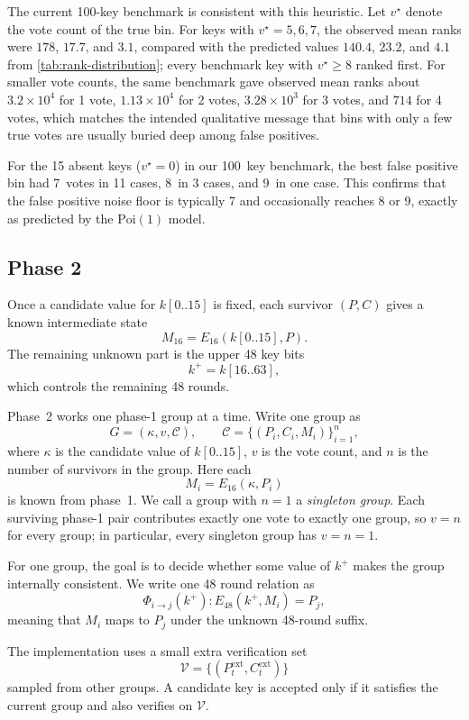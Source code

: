\documentclass[version=preprint]{iacrcc}
\begin{document}
The current 100-key benchmark is consistent with this heuristic.
Let $v^{\star}$ denote the vote count of the true bin.
For keys with $v^{\star}=5,6,7$, the observed mean ranks were $178$, $17.7$, and $3.1$, compared with the predicted values $140.4$, $23.2$, and $4.1$ from \autoref{tab:rank-distribution}; every benchmark key with $v^{\star} \geq 8$ ranked first.
For smaller vote counts, the same benchmark gave observed mean ranks about $3.2 \times 10^4$ for 1 vote, $1.13 \times 10^4$ for 2 votes, $3.28 \times 10^3$ for 3 votes, and $714$ for 4 votes, which matches the intended qualitative message that bins with only a few true votes are usually buried deep among false positives.

For the 15 absent keys ($v^{\star} = 0$) in our 100~key benchmark, the best false positive bin had 7~votes in 11 cases, 8~in 3 cases, and 9~in one case.
This confirms that the false positive noise floor is typically 7 and occasionally reaches 8 or 9, exactly as predicted by the $\mathrm{Poi}(1)$ model.

\subsection{Phase 2}

Once a candidate value for $k[0..15]$ is fixed, each survivor $(P,C)$ gives a known intermediate state
\[
M_{16} = E_{16}(k[0..15],P).
\]
The remaining unknown part is the upper 48 key bits
\[
k^{+} = k[16..63],
\]
which controls the remaining 48 rounds.

Phase~2 works one phase-1 group at a time.
Write one group as
\[
G = (\kappa, v, \mathcal{C}),
\qquad
\mathcal{C} = \{(P_i, C_i, M_i)\}_{i=1}^{n},
\]
where $\kappa$ is the candidate value of $k[0..15]$, $v$ is the vote count, and $n$ is the number of survivors in the group.
Here each
\[
M_i = E_{16}(\kappa,P_i)
\]
is known from phase~1.
We call a group with $n=1$ a \emph{singleton group}.
Each surviving phase-1 pair contributes exactly one vote to exactly one group, so $v=n$ for every group; in particular, every singleton group has $v=n=1$.

For one group, the goal is to decide whether some value of $k^{+}$ makes the group internally consistent.
We write one 48 round relation as
\[
\Phi_{i \to j}(k^{+}) : E_{48}(k^{+}, M_i) = P_j,
\]
meaning that $M_i$ maps to $P_j$ under the unknown 48-round suffix.

The implementation uses a small extra verification set
\[
\mathcal{V} = \{(P_t^{\mathrm{ext}}, C_t^{\mathrm{ext}})\}
\]
sampled from other groups.
A candidate key is accepted only if it satisfies the current group and also verifies on $\mathcal{V}$.
\end{document}
